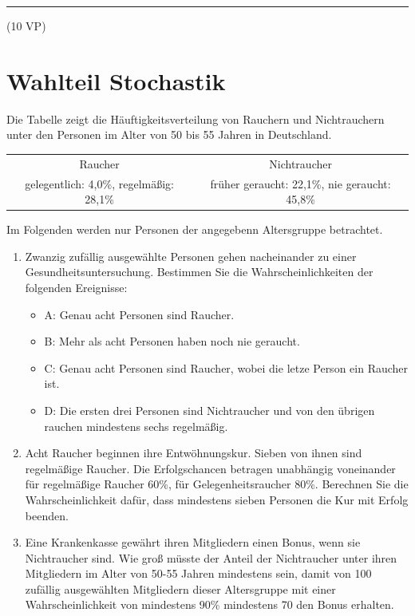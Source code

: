 \vfill

\hfill\rule{1.5cm}{0.4mm}

\hfill (10 VP)\hspace{0.22cm}


\section{Wahlteil Stochastik}
Die Tabelle zeigt die Häuftigkeitsverteilung von Rauchern und Nichtrauchern unter den Personen im Alter von 50 bis 55 Jahren in Deutschland.

\vspace{2em}
\begin{tabular}{ c|c }
	Raucher & Nichtraucher\\
	gelegentlich: 4,0\%, regelmäßig: 28,1\% & früher geraucht: 22,1\%,  nie geraucht: 45,8\%
\end{tabular}
\vspace{2em}

\noindent
Im Folgenden werden nur Personen der angegebenn Altersgruppe betrachtet.
\begin{enumerate}
	\item Zwanzig zufällig ausgewählte Personen gehen nacheinander zu einer Gesundheitsuntersuchung. Bestimmen Sie die Wahrscheinlichkeiten der folgenden Ereignisse:
	\begin{itemize}
		\item A: Genau acht Personen sind Raucher.
		\item B: Mehr als acht Personen haben noch nie geraucht.
		\item C: Genau acht Personen sind Raucher, wobei die letze Person ein Raucher ist.
		\item D: Die ersten drei Personen sind Nichtraucher und von den übrigen rauchen mindestens sechs regelmäßig.
	\end{itemize}
	\item Acht Raucher beginnen ihre Entwöhnungskur. Sieben von ihnen sind regelmäßige Raucher. Die Erfolgschancen betragen unabhängig voneinander für regelmäßige Raucher 60\%, für Gelegenheitsraucher 80\%. Berechnen Sie die Wahrscheinlichkeit dafür, dass mindestens sieben Personen die Kur mit Erfolg beenden.
	\item Eine Krankenkasse gewährt ihren Mitgliedern einen Bonus, wenn sie Nichtraucher sind. Wie groß müsste der Anteil der Nichtraucher unter ihren Mitgliedern im Alter von 50-55 Jahren mindestens sein, damit von 100 zufällig ausgewählten Mitgliedern dieser Altersgruppe mit einer Wahrscheinlichkeit von mindestens 90\% mindestens 70 den Bonus erhalten.
\end{enumerate}


